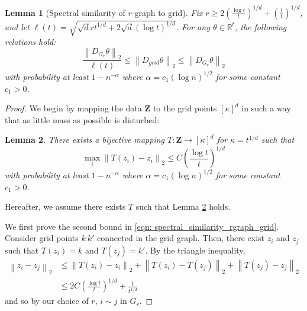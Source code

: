 \documentclass{article}
\newcommand{\Reals}{\mathbb{R}}
\newcommand{\norm}[1]{\left\lVert#1\right\rVert}
\newcommand{\1}{\mathbb{I}}
\newcommand{\Zbf}{\mathbf{Z}}
\theoremstyle{alden}
\theoremstyle{aldenthm}
\newtheorem{lemma}{Lemma}
\theoremstyle{definition}
\theoremstyle{remark}
\begin{document}
\begin{lemma}[Spectral similarity of $r$-graph to grid]
	\label{lem: spectral_similarity_rgraph_grid}
	Fix $r \geq 2 \left(\frac{\log t}{t}\right)^{1/d} + (\frac{1}{t})^{1/d}$, and let $\ell(t) = \sqrt{\sqrt{d} r t^{1/d} + 2\sqrt{d}(\log t)^{1/d}}$. For any $\theta \in \Reals^t$, the following relations hold:
	\begin{equation}
	\label{eqn: spectral_similarity_rgraph_grid}
	\frac{\norm{D_{G_r}\theta}_2}{\ell(t)} \leq \norm{D_{grid}\theta}_2 \leq \norm{D_{G_r}\theta}_2
	\end{equation}
	with probability at least $1 - n^{-\alpha}$ where $\alpha = c_1 (\log n)^{1/2}$ for some constant $c_1 > 0$.
\end{lemma}
\begin{proof}
	We begin by mapping the data $\Zbf$ to the grid points $[\kappa]^d$ in such a way that as little mass as possible is disturbed:
	\begin{lemma}
		\label{lem: mass_transport_mapping}
		There exists a bijective mapping $T: \Zbf \to [\kappa]^d$ for $\kappa = t^{1/d}$ such that
		\begin{equation*}
		\max_{i} \norm{T(z_i) - z_i}_2 \leq C\left(\frac{\log t}{t}\right)^{1/d}
		\end{equation*}
		with probability at least $1 - n^{-\alpha}$ where $\alpha = c_1 (\log n)^{1/2}$ for some constant $c_1 > 0$.
	\end{lemma}
	Hereafter, we assume there exists $T$ such that Lemma \ref{lem: mass_transport_mapping} holds.
	
	We first prove the second bound in \eqref{eqn: spectral_similarity_rgraph_grid}.  Consider grid points $k ~ k'$ connected in the grid graph. Then, there exist $z_i$ and $z_j$ such that $T(z_i) = k$ and $T(z_j) = k'$. By the triangle inequality,
	\begin{align*}
	\norm{z_i - z_j}_2 & \leq \norm{T(z_i) - z_i}_2 + \norm{T(z_i) - T(z_j)}_2 + \norm{T(z_j) - z_j}_2 \\
	& \leq 2C\left(\frac{\log t}{t}\right)^{1/d} + \frac{1}{t^{1/d}}
	\end{align*}
	and so by our choice of $r$, $i \sim j$ in $G_r$.
	

\end{proof}
\end{document}
